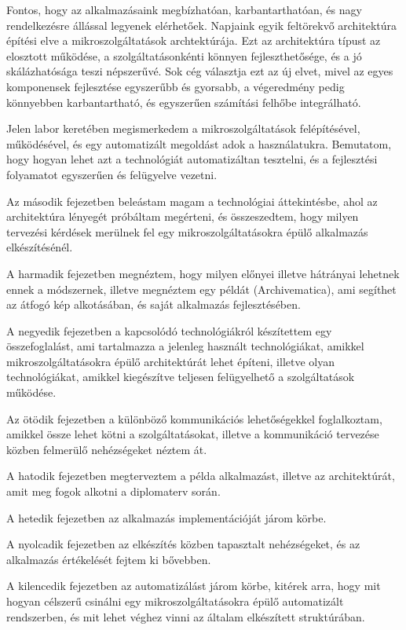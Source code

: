 \documentclass[11pt,magyar,a4paper,twoside,]{report}
\begin{document}
Fontos, hogy az alkalmazásaink megbízhatóan, karbantarthatóan, és nagy
rendelkezésre állással legyenek elérhetőek. Napjaink egyik feltörekvő
architektúra építési elve a mikroszolgáltatások archtektúrája. Ezt az
architektúra típust az elosztott működése, a szolgáltatásonkénti könnyen
fejleszthetősége, és a jó skálázhatósága teszi népszerűvé. Sok cég
választja ezt az új elvet, mivel az egyes komponensek fejlesztése
egyszerűbb és gyorsabb, a végeredmény pedig könnyebben karbantartható,
és egyszerűen számítási felhőbe integrálható.

Jelen labor keretében megismerkedem a mikroszolgáltatások felépítésével,
működésével, és egy automatizált megoldást adok a használatukra.
Bemutatom, hogy hogyan lehet azt a technológiát automatizáltan
tesztelni, és a fejlesztési folyamatot egyszerűen és felügyelve vezetni.

Az második fejezetben beleástam magam a technológiai áttekintésbe, ahol
az architektúra lényegét próbáltam megérteni, és összeszedtem, hogy
milyen tervezési kérdések merülnek fel egy mikroszolgáltatásokra épülő
alkalmazás elkészítésénél.

A harmadik fejezetben megnéztem, hogy milyen előnyei illetve hátrányai
lehetnek ennek a módszernek, illetve megnéztem egy példát
(Archivematica), ami segíthet az átfogó kép alkotásában, és saját
alkalmazás fejlesztésében.

A negyedik fejezetben a kapcsolódó technológiákról készítettem egy
összefoglalást, ami tartalmazza a jelenleg használt technológiákat,
amikkel mikroszolgáltatásokra épülő architektúrát lehet építeni, illetve
olyan technológiákat, amikkel kiegészítve teljesen felügyelhető a
szolgáltatások működése.

Az ötödik fejezetben a különböző kommunikációs lehetőségekkel
foglalkoztam, amikkel össze lehet kötni a szolgáltatásokat, illetve a
kommunikáció tervezése közben felmerülő nehézségeket néztem át.

A hatodik fejezetben megterveztem a példa alkalmazást, illetve az
architektúrát, amit meg fogok alkotni a diplomaterv során.

A hetedik fejezetben az alkalmazás implementációját járom körbe.

A nyolcadik fejezetben az elkészítés közben tapasztalt nehézségeket, és
az alkalmazás értékelését fejtem ki bővebben.

A kilencedik fejezetben az automatizálást járom körbe, kitérek arra,
hogy mit hogyan célszerű csinálni egy mikroszolgáltatásokra épülő
automatizált rendszerben, és mit lehet véghez vinni az általam
elkészített struktúrában.
\end{document}
